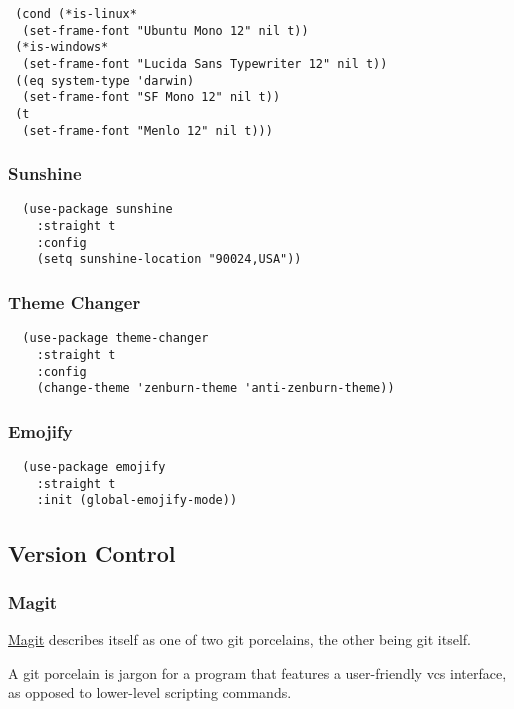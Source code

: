 \documentclass[11pt]{article}
\begin{document}
\begin{verbatim}
 (cond (*is-linux*
  (set-frame-font "Ubuntu Mono 12" nil t))
 (*is-windows*
  (set-frame-font "Lucida Sans Typewriter 12" nil t))
 ((eq system-type 'darwin)
  (set-frame-font "SF Mono 12" nil t))
 (t
  (set-frame-font "Menlo 12" nil t)))
\end{verbatim}

\subsubsection*{Sunshine}
\label{sec:org395bcc1}

\begin{verbatim}
  (use-package sunshine
    :straight t
    :config
    (setq sunshine-location "90024,USA"))
\end{verbatim}

\subsubsection*{Theme Changer}
\label{sec:org76a1bc7}

\begin{verbatim}
  (use-package theme-changer
    :straight t
    :config
    (change-theme 'zenburn-theme 'anti-zenburn-theme))
\end{verbatim}

\subsubsection*{Emojify}
\label{sec:orgc8d3e70}

\begin{verbatim}
  (use-package emojify
    :straight t
    :init (global-emojify-mode))
\end{verbatim}

\subsection*{Version Control}
\label{sec:org05a5b3b}
\subsubsection*{Magit}
\label{sec:org07e2eee}

\href{https://github.com/magit/magit}{Magit} describes itself as one of two git porcelains, the other being
git itself.

A git porcelain is jargon for a program that features a user-friendly
vcs interface, as opposed to lower-level scripting commands.
\end{document}
